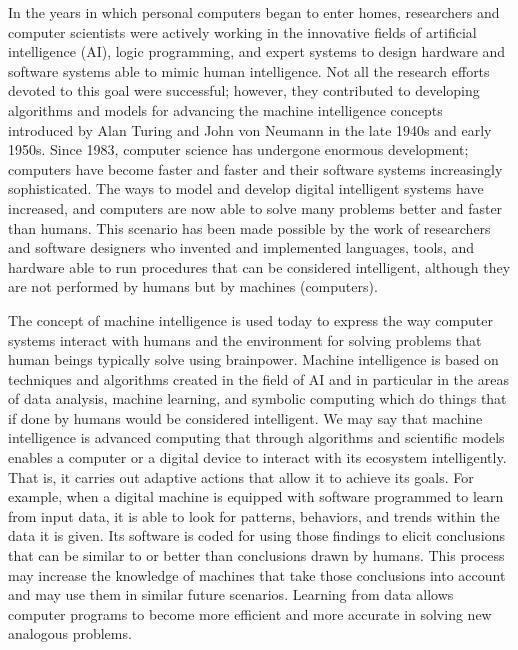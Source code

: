 In the years in which personal computers began to enter homes, researchers and computer scientists were actively working in the innovative fields of artificial intelligence (AI), logic programming, and expert systems to design hardware and software systems able to mimic human intelligence. Not all the research efforts devoted to this goal were successful; however, they contributed to developing algorithms and models for advancing the machine intelligence concepts introduced by Alan Turing and John von Neumann in the late 1940s and early 1950s. Since 1983, computer science has undergone enormous development; computers have become faster and faster and their software systems increasingly sophisticated. The ways to model and develop digital intelligent systems have increased, and computers are now able to solve many problems better and faster than humans. This scenario has been made possible by the work of researchers and software designers who invented and implemented languages, tools, and hardware able to run procedures that can be considered intelligent, although they are not performed by humans but by machines (computers).

The concept of machine intelligence is used today to express the way computer systems interact with humans and the environment for solving problems that human beings typically solve using brainpower. Machine intelligence is based on techniques and algorithms created in the field of AI and in particular in the areas of data analysis, machine learning, and symbolic computing which do things that if done by humans would be considered intelligent. We may say that machine intelligence is advanced computing that through algorithms and scientific models enables a computer or a digital device to interact with its ecosystem intelligently. That is, it carries out adaptive actions that allow it to achieve its goals. For example, when a digital machine is equipped with software programmed to learn from input data, it is able to look for patterns, behaviors, and trends within the data it is given. Its software is coded for using those findings to elicit conclusions that can be similar to or better than conclusions drawn by humans. This process may increase the knowledge of machines that take those conclusions into account and may use them in similar future scenarios. Learning from data allows computer programs to become more efficient and more accurate in solving new analogous problems.

